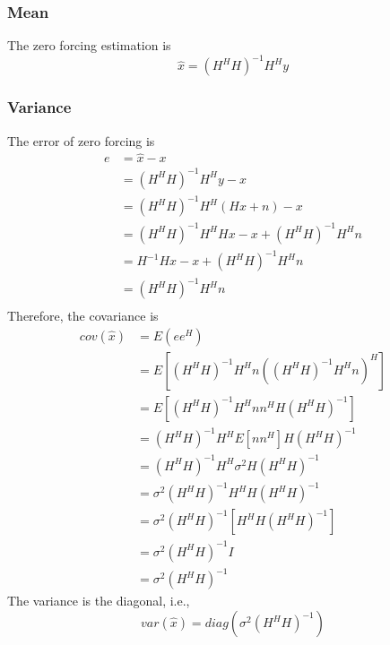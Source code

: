 \documentclass{article}
\begin{document}
\subsubsection{Mean}
The zero forcing estimation is
\begin{equation}
\hat{x} = (H^HH)^{-1}H^Hy
\end{equation}

\subsubsection{Variance}
The error of zero forcing is
\begin{equation}
\begin{split}
e &= \hat{x} - x \\
&= (H^HH)^{-1}H^Hy - x \\
&= (H^HH)^{-1}H^H(Hx+n) - x \\
&= (H^HH)^{-1}H^HHx - x + (H^HH)^{-1}H^Hn\\
&= H^{-1}Hx - x + (H^HH)^{-1}H^Hn\\
&= (H^HH)^{-1}H^Hn\\
\end{split}
\end{equation}
Therefore, the covariance is
\begin{equation}
\begin{split}
cov(\hat{x}) &= E(ee^H) \\
&= E[(H^HH)^{-1}H^Hn((H^HH)^{-1}H^Hn)^H] \\
&= E[(H^HH)^{-1}H^Hn n^HH(H^HH)^{-1}] \\
&= (H^HH)^{-1}H^HE[nn^H]H(H^HH)^{-1} \\
&= (H^HH)^{-1}H^H\sigma^2H(H^HH)^{-1} \\
&= \sigma^2(H^HH)^{-1}H^HH(H^HH)^{-1} \\
&= \sigma^2(H^HH)^{-1}[H^HH(H^HH)^{-1}] \\
&= \sigma^2(H^HH)^{-1}I \\
&= \sigma^2(H^HH)^{-1}
\end{split}
\end{equation}
The variance is the diagonal, i.e.,
\begin{equation}
var(\hat{x}) = diag(\sigma^2(H^HH)^{-1}) 
\end{equation}
\end{document}

